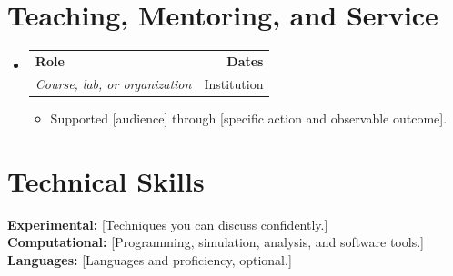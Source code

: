 \documentclass[letterpaper,11pt]{article}
\makeatletter
\newcommand{\resumeItem}[1]{\item{#1 \vspace{-2pt}}}
\newcommand{\resumeSubheading}[4]{
  \vspace{-2pt}\item
    \begin{tabular*}{1.0\textwidth}[t]{l@{\extracolsep{\fill}}r}
      \textbf{#1} & \textbf{\small #2} \\
      \textit{\small#3}{}& \small #4 \\
    \end{tabular*}\vspace{-7pt}
}
\newcommand{\resumeSubHeadingListStart}{\begin{itemize}[leftmargin=0.0in, label={}]}
\newcommand{\resumeSubHeadingListEnd}{\end{itemize}}
\newcommand{\resumeItemListStart}{\begin{itemize}}
\newcommand{\resumeItemListEnd}{\end{itemize}\vspace{-5pt}}
\makeatother
\begin{document}
\section{Teaching, Mentoring, and Service}
\resumeSubHeadingListStart
\resumeSubheading{Role}{Dates}{Course, lab, or organization}{Institution}
\resumeItemListStart
\resumeItem{Supported [audience] through [specific action and observable outcome].}
\resumeItemListEnd
\resumeSubHeadingListEnd
\section{Technical Skills}
\textbf{Experimental:} [Techniques you can discuss confidently.]\\
\textbf{Computational:} [Programming, simulation, analysis, and software tools.]\\
\textbf{Languages:} [Languages and proficiency, optional.]
\end{document}
